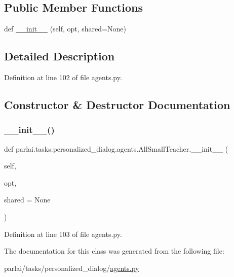 \subsection*{Public Member Functions}
\begin{DoxyCompactItemize}
\item 
def \hyperlink{classparlai_1_1tasks_1_1personalized__dialog_1_1agents_1_1AllSmallTeacher_a1bb0f39431c43a72a244ae11cd3f1794}{\+\_\+\+\_\+init\+\_\+\+\_\+} (self, opt, shared=None)
\end{DoxyCompactItemize}


\subsection{Detailed Description}


Definition at line 102 of file agents.\+py.



\subsection{Constructor \& Destructor Documentation}
\mbox{\label{classparlai_1_1tasks_1_1personalized__dialog_1_1agents_1_1AllSmallTeacher_a1bb0f39431c43a72a244ae11cd3f1794}} 
\subsubsection{\texorpdfstring{\+\_\+\+\_\+init\+\_\+\+\_\+()}{\_\_init\_\_()}}
{\footnotesize\ttfamily def parlai.\+tasks.\+personalized\+\_\+dialog.\+agents.\+All\+Small\+Teacher.\+\_\+\+\_\+init\+\_\+\+\_\+ (\begin{DoxyParamCaption}\item[{}]{self,  }\item[{}]{opt,  }\item[{}]{shared = {\ttfamily None} }\end{DoxyParamCaption})}



Definition at line 103 of file agents.\+py.



The documentation for this class was generated from the following file\+:\begin{DoxyCompactItemize}
\item 
parlai/tasks/personalized\+\_\+dialog/\hyperlink{parlai_2tasks_2personalized__dialog_2agents_8py}{agents.\+py}\end{DoxyCompactItemize}
